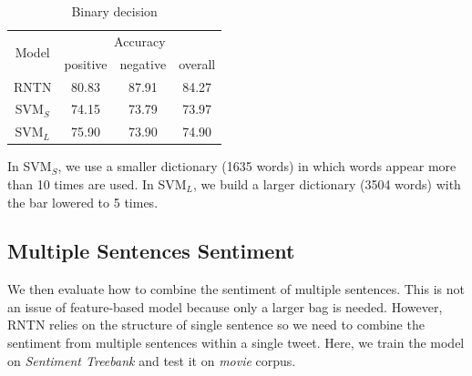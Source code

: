 \begin{table}[H]
  \begin{center}
    \begin{tabular}{cccc}\hline
      \multirow{2}{*}{Model} 
      & \multicolumn{3}{c}{Accuracy} \\\cline{2-4}
    & positive & negative & overall \\ \hline
    RNTN  & 80.83      &   87.91   &  84.27      \\ 
    SVM$_S$  & 74.15      &  73.79    &    73.97     \\ 
    SVM$_L$  & 75.90      & 73.90         &   74.90      \\ \hline
    \end{tabular}
    \end{center}
    \caption{\label{exp_1} Binary decision}
\end{table}

In SVM$_S$, we use a smaller dictionary (1635 words) in which words appear more than 10 times are used. In SVM$_L$, we build a larger dictionary (3504 words) with the bar lowered to 5 times. 


\subsection{Multiple Sentences Sentiment}
We then evaluate how to combine the sentiment of multiple sentences. This is not an issue of feature-based model because only a larger bag is needed. However, RNTN relies on the structure of single sentence so we need to combine the sentiment from multiple sentences within a single tweet. Here, we train the model on \textit{Sentiment Treebank} and test it on \textit{movie} corpus. 

